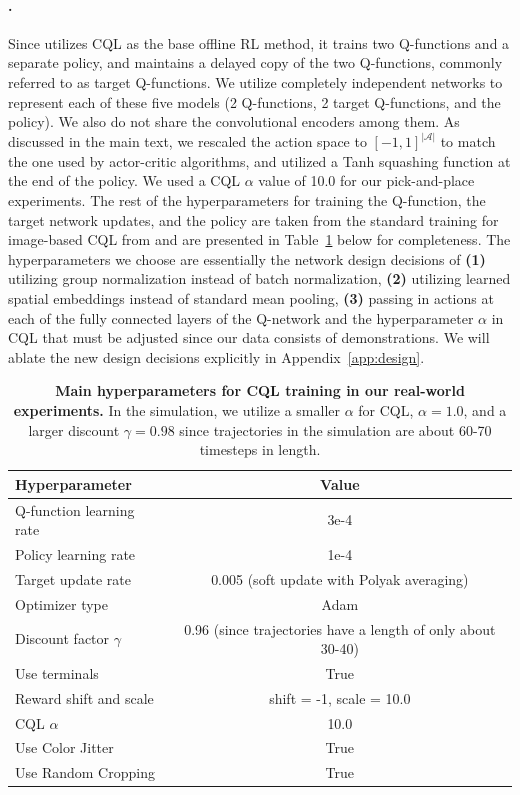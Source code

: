 \documentclass[../thesis.tex]{subfiles}
\begin{document}
\paragraph{\ptrmethodname.} Since \ptrmethodname utilizes CQL as the base offline RL method, it trains two Q-functions and a separate policy, and maintains a delayed copy of the two Q-functions, commonly referred to as target Q-functions. We utilize completely independent networks to represent each of these five models (2 Q-functions, 2 target Q-functions, and the policy). We also do not share the convolutional encoders among them. As discussed in the main text, we rescaled the action space to $[-1, 1]^{|\mathcal{A}|}$ to match the one used by actor-critic algorithms, and utilized a Tanh squashing function at the end of the policy. We used a CQL $\alpha$ value of 10.0 for our pick-and-place experiments. The rest of the hyperparameters for training the Q-function, the target network updates, and the policy are taken from the standard training for image-based CQL from \citet{singh2020cog} and are presented in Table~\ref{tab:hparams_cql} below for completeness. The hyperparameters we choose are essentially the network design decisions of \textbf{(1)} utilizing group normalization instead of batch normalization, \textbf{(2)} utilizing learned spatial embeddings instead of standard mean pooling, \textbf{(3)} passing in actions at each of the fully connected layers of the Q-network and the hyperparameter $\alpha$ in CQL that must be adjusted since our data consists of demonstrations. We will ablate the new design decisions explicitly in Appendix~\ref{app:design}.

\begin{table}[h]
\centering
\begin{tabular}{l|c}
\toprule
\textbf{Hyperparameter} & \textbf{Value}\\  \midrule
Q-function learning rate & 3e-4 \\
Policy learning rate & 1e-4 \\
Target update rate & 0.005 (soft update with Polyak averaging) \\
Optimizer type & Adam \\
Discount factor $\gamma$ & 0.96 (since trajectories have a length of only about 30-40) \\
Use terminals & True \\
Reward shift and scale & shift = -1, scale = 10.0 \\
CQL $\alpha$ & 10.0 \\
Use Color Jitter & True \\
Use Random Cropping & True \\
\bottomrule
\end{tabular}
\vspace{0.07cm}
\caption{\footnotesize{\textbf{Main hyperparameters for CQL training in our real-world experiments.} In the simulation, we utilize a smaller $\alpha$ for CQL, $\alpha=1.0$, and a larger discount $\gamma = 0.98$ since trajectories in the simulation are about 60-70 timesteps in length. }}
\label{tab:hparams_cql}
\end{table}
\end{document}
